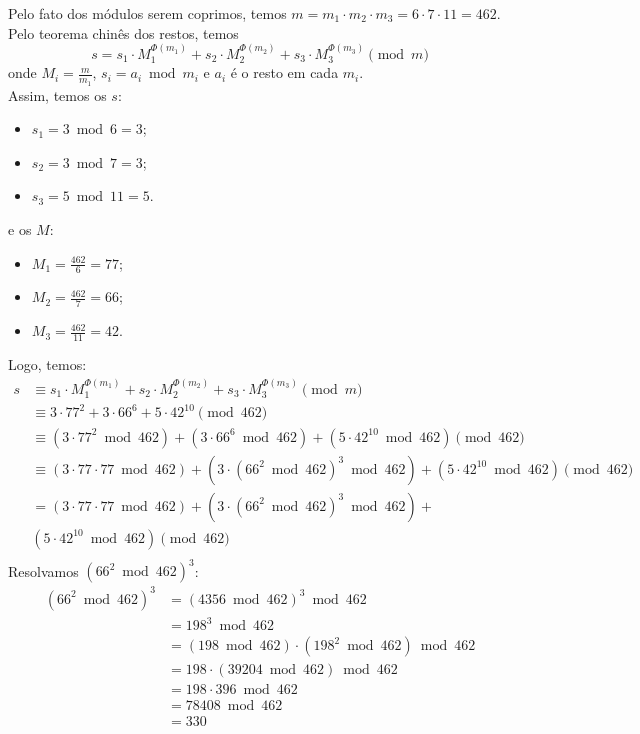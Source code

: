 Pelo fato dos módulos serem coprimos, temos $m = m_1 \cdot m_2 \cdot m_3 = 6 \cdot 7 \cdot 11 = 462$. \\
Pelo teorema chinês dos restos, temos 
\begin{displaymath}
	s = s_1 \cdot M_1^{\Phi(m_1)} + s_2 \cdot M_2^{\Phi(m_2)} + s_3 \cdot M_3^{\Phi(m_3)} \pmod{m}
\end{displaymath}
onde $M_i = \frac{m}{m_1}$, $s_i = a_i \bmod{m_i}$ e $a_i$ é o resto em cada $m_i$. \\ 
Assim, temos os $s$:
\begin{itemize}
	\item $s_1 = 3 \bmod{6} = 3$;
	\item $s_2 = 3 \bmod{7} = 3$;
	\item $s_3 = 5 \bmod{11} = 5$.
\end{itemize}
e os $M$:
\begin{itemize}
	\item $M_1 = \frac{462}{6} = 77$;
	\item $M_2 = \frac{462}{7} = 66$;
	\item $M_3 = \frac{462}{11} = 42$.
\end{itemize}
Logo, temos:
\begin{align*}
	s &\equiv s_1 \cdot M_1^{\Phi(m_1)} + s_2 \cdot M_2^{\Phi(m_2)} + s_3 \cdot M_3^{\Phi(m_3)} \pmod{m} \\
	&\equiv 3 \cdot 77^2 + 3 \cdot 66^6 + 5 \cdot 42^{10} \pmod{462} \\
	&\equiv (3 \cdot 77^2 \bmod{462}) + (3 \cdot 66^6 \bmod{462}) + (5 \cdot 42^{10} \bmod{462}) \pmod{462} \\
	&\equiv (3 \cdot 77 \cdot 77 \bmod{462}) + (3 \cdot (66^2 \bmod{462})^3 \bmod{462}) + (5 \cdot 42^{10} \bmod{462}) \pmod{462} \\
	&= (3 \cdot 77 \cdot 77 \bmod{462}) + (3 \cdot (66^2 \bmod{462})^3 \bmod{462}) + \\& (5 \cdot 42^{10} \bmod{462}) \pmod{462} \\
\end{align*}
Resolvamos $(66^2 \bmod{462})^3$:
\begin{align*}
	(66^2 \bmod{462})^3 &= (4356 \bmod{462})^3 \bmod{462} \\
	&= 198^3 \bmod{462} \\
	&= (198 \bmod{462}) \cdot (198^2 \bmod{462}) \bmod{462} \\
	&= 198 \cdot (39204 \bmod{462}) \bmod{462} \\
	&= 198 \cdot 396 \bmod{462} \\
	&= 78408 \bmod{462} \\
	&= 330 \\
\end{align*}

